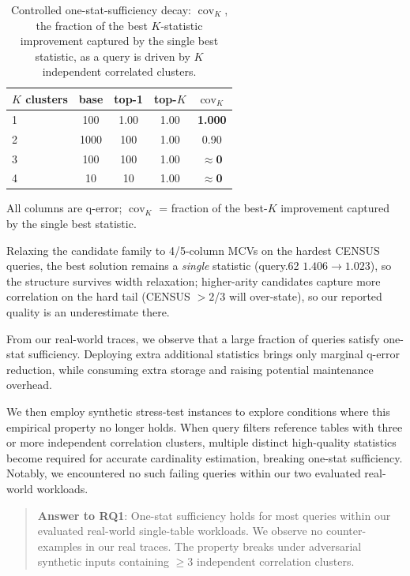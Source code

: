 \documentclass[sigconf, nonacm]{acmart}
\begin{document}
\begin{table}[t]
\caption{Controlled one-stat-sufficiency decay: $\operatorname{cov}_K$, the
fraction of the best $K$-statistic improvement captured by the single best
statistic, as a query is driven by $K$ independent correlated clusters.}
\label{tab:sweep}
\small
\begin{tabular}{lcccc}
\toprule
$K$ clusters & base & top-1 & top-$K$ & $\operatorname{cov}_K$\\
\midrule
1 & 100 & 1.00 & 1.00 & \textbf{1.000}\\
2 & 1000 & 100 & 1.00 & 0.90\\
3 & 100 & 100 & 1.00 & \textbf{$\approx$0}\\
4 & 10  & 10  & 1.00 & \textbf{$\approx$0}\\
\bottomrule
\end{tabular}

{\footnotesize All columns are q-error; $\operatorname{cov}_K$ = fraction of the best-$K$ improvement captured by the single best statistic.}
\end{table}

Relaxing the candidate family to 4/5-column MCVs on the hardest CENSUS
queries, the best solution remains a \emph{single} statistic (query.62
$1.406\to1.023$), so the structure survives width relaxation; higher-arity
candidates capture more correlation on the hard tail (CENSUS $>2$/3 will over-state), so our reported quality is an underestimate there.

From our real-world traces, we observe that a large fraction of queries satisfy one-stat sufficiency.
Deploying extra additional statistics brings only marginal q-error reduction, while consuming extra storage and raising potential maintenance overhead.

We then employ synthetic stress-test instances to explore conditions where this empirical property no longer holds.
When query filters reference tables with three or more independent correlation clusters, multiple distinct high-quality statistics become required for accurate cardinality estimation, breaking one-stat sufficiency.
Notably, we encountered no such failing queries within our two evaluated real-world workloads.

\begin{quote}
\noindent\textbf{Answer to RQ1}:
One-stat sufficiency holds for most queries within our evaluated real-world single-table workloads.
We observe no counter-examples in our real traces.
The property breaks under adversarial synthetic inputs containing $\ge 3$ independent correlation clusters.
\end{quote}
\end{document}
